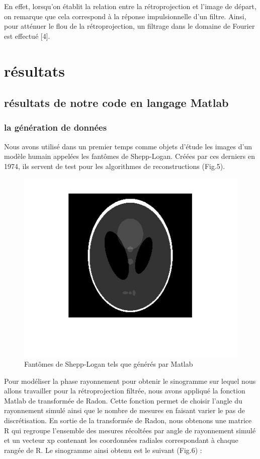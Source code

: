 \documentclass[conference]{IEEEtran}
\begin{document}
 En effet, lorsqu'on établit la relation entre la rétroprojection et l'image de départ, on remarque que cela correspond à la réponse impulsionnelle d'un filtre. Ainsi, pour atténuer le flou de la rétroprojection, un filtrage dans le domaine de Fourier est effectué [4].

\section{résultats }

\subsection{résultats de notre code en langage Matlab}

\subsubsection{la génération de données }

Nous avons utilisé dans un premier temps comme objets d'étude les images d'un modèle humain appelées les fantômes de Shepp-Logan. Créées par ces derniers en 1974, ils servent de test pour les algorithmes de reconstructions (Fig.5).

\begin{figure}[H]
\centering
\includegraphics[scale=0.7]{Shepp-logan}
\caption[Fantômes de Shepp-Logan tels que générés par Matlab]{Fantômes de Shepp-Logan tels que générés par Matlab}
\label{fig:gallery}
\end{figure}

Pour modéliser la phase rayonnement pour obtenir le sinogramme sur lequel nous allons travailler pour la rétroprojection filtrée, nous avons appliqué la fonction Matlab de transformée de Radon. Cette fonction permet de choisir l'angle du rayonnement simulé ainsi que le nombre de mesures en faisant varier le pas de discrétisation.
En sortie de la transformée de Radon, nous obtenons une matrice R qui regroupe l'ensemble des mesures récoltées par angle de rayonnement simulé et un vecteur xp contenant les coordonnées radiales correspondant à chaque rangée de R. Le sinogramme ainsi obtenu est le suivant (Fig.6) :
\end{document}
